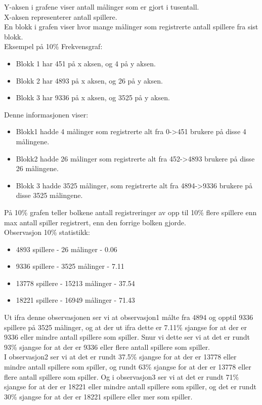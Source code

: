 \documentclass[a4paper, norsk, 12pt]{article}
\begin{document}
Y-aksen i grafene viser antall målinger som er gjort i tusentall.\\
X-aksen representerer antall spillere.\\
En blokk i grafen viser hvor mange målinger som registrerte antall spillere fra sist blokk.\\
Eksempel på 10\% Frekvensgraf:
\begin{itemize}
\item Blokk 1 har   451 på x aksen, og   4 på y aksen.
\item Blokk 2 har 4893 på x aksen, og 26 på y aksen.
\item Blokk 3 har 9336 på x aksen, og 3525 på y aksen.
\end{itemize}

Denne informasjonen viser:
\begin{itemize}
\item Blokk1 hadde 4 målinger som registrerte alt fra 0->451 brukere på disse 4 målingene.
\item Blokk2 hadde 26 målinger som registrerte alt fra 452->4893 brukere på disse 26 målingene.
\item Blokk 3 hadde 3525 målinger, som registrerte alt fra 4894->9336 brukere på disse 3525 målingene.
\end{itemize}

På 10\% grafen teller bolkene antall registreringer av opp til 10\% flere spillere enn max antall spiller registrert, enn den forrige bolken gjorde. \\

Observasjon 10\% statistikk:
\begin{itemize}
\item 4893 spillere - 26 målinger - 0.06%
\item 9336 spillere - 3525 målinger - 7.11%
\item 13778 spillere - 15213 målinger - 37.54%
\item 18221 spillere - 16949 målinger - 71.43%
\end{itemize}

Ut ifra denne observasjonen ser vi at observasjon1 målte fra 4894 og opptil 9336 spillere på 3525 målinger, og at der ut ifra dette er 7.11\% sjangse for at der er 9336 eller mindre antall spillere som spiller. Snur vi dette ser vi at det er rundt 93\% sjangse for at der er 9336 eller flere antall spillere som spiller.\\

I observasjon2 ser vi at det er rundt 37.5\% sjangse for at der er 13778 eller mindre antall spillere som spiller, og rundt 63\% sjangse for at der er 13778 eller flere antall spillere som spiller. Og i observasjon3 ser vi at det er rundt 71\% sjangse for at der er 18221 eller mindre antall spillere som spiller, og det er rundt 30\% sjangse for at der er 18221 spillere eller mer som spiller.\\
\end{document}
